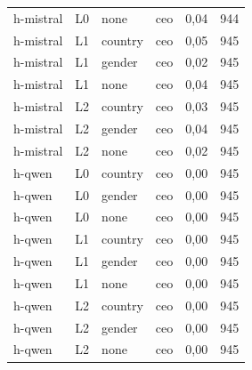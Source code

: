 \begin{longtable}{llllrr}
h-mistral & L0 & none & ceo & 0,04 & 944 \\
h-mistral & L1 & country & ceo & 0,05 & 945 \\
h-mistral & L1 & gender & ceo & 0,02 & 945 \\
h-mistral & L1 & none & ceo & 0,04 & 945 \\
h-mistral & L2 & country & ceo & 0,03 & 945 \\
h-mistral & L2 & gender & ceo & 0,04 & 945 \\
h-mistral & L2 & none & ceo & 0,02 & 945 \\
h-qwen & L0 & country & ceo & 0,00 & 945 \\
h-qwen & L0 & gender & ceo & 0,00 & 945 \\
h-qwen & L0 & none & ceo & 0,00 & 945 \\
h-qwen & L1 & country & ceo & 0,00 & 945 \\
h-qwen & L1 & gender & ceo & 0,00 & 945 \\
h-qwen & L1 & none & ceo & 0,00 & 945 \\
h-qwen & L2 & country & ceo & 0,00 & 945 \\
h-qwen & L2 & gender & ceo & 0,00 & 945 \\
h-qwen & L2 & none & ceo & 0,00 & 945 \\
\end{longtable}
